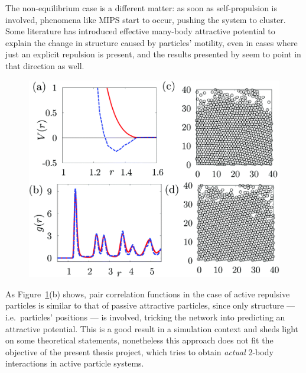 \documentclass[../../master_thesis_np.tex]{subfiles}
\begin{document}
	The non-equilibrium case is a different matter: as soon as self-propulsion is involved, phenomena like MIPS start to occur, pushing the system to cluster. 
	Some literature has introduced effective many-body attractive potential to explain the change in structure caused by particles' motility, even in cases where just an explicit repulsion is present, and the results presented by \citeauthor{bag_interaction_2021} seem to point in that direction as well. 
 	\begin{figure}[htp]
		\centering
		\includegraphics[width=\singfigwidth]{bag2.png}
		\caption{\cite{bag_interaction_2021}}
		\label{fig:bag2}
	\end{figure}
	As Figure~\ref{fig:bag2}(b) shows, pair correlation functions in the case of active repulsive particles is similar to that of passive attractive particles, since only structure --- i.e.\ particles' positions --- is involved, tricking the network into predicting an attractive potential. 
	This is a good result in a simulation context and sheds light on some theoretical statements, nonetheless this approach does not fit the objective of the present thesis project, which tries to obtain \emph{actual} 2-body interactions in active particle systems. 
	
\end{document}
